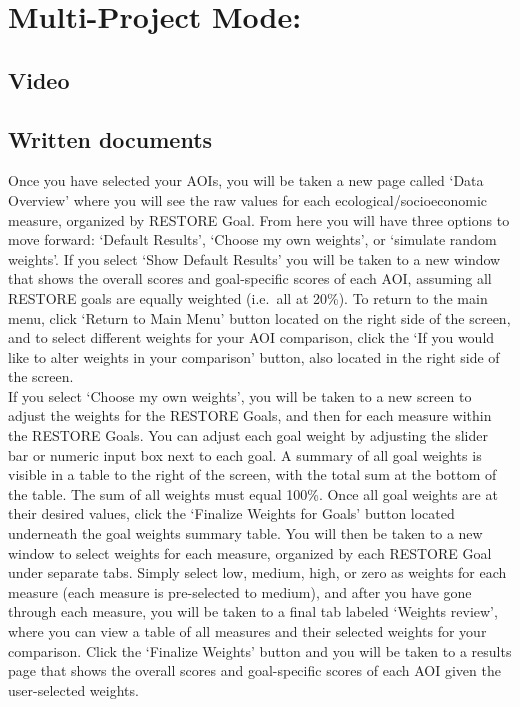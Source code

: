 \documentclass[
]{book}
\begin{document}
\hypertarget{multi-project-mode}{%
\chapter{Multi-Project Mode:}\label{multi-project-mode}}

\hypertarget{video-3}{%
\section{Video}\label{video-3}}

\hypertarget{written-documents-3}{%
\section{Written documents}\label{written-documents-3}}

Once you have selected your AOIs, you will be taken a new page called `Data Overview' where you will see the raw values for each ecological/socioeconomic measure, organized by RESTORE Goal. From here you will have three options to move forward: `Default Results', `Choose my own weights', or `simulate random weights'.
If you select `Show Default Results' you will be taken to a new window that shows the overall scores and goal-specific scores of each AOI, assuming all RESTORE goals are equally weighted (i.e.~all at 20\%). To return to the main menu, click `Return to Main Menu' button located on the right side of the screen, and to select different weights for your AOI comparison, click the `If you would like to alter weights in your comparison' button, also located in the right side of the screen.\\
If you select `Choose my own weights', you will be taken to a new screen to adjust the weights for the RESTORE Goals, and then for each measure within the RESTORE Goals. You can adjust each goal weight by adjusting the slider bar or numeric input box next to each goal. A summary of all goal weights is visible in a table to the right of the screen, with the total sum at the bottom of the table. The sum of all weights must equal 100\%. Once all goal weights are at their desired values, click the `Finalize Weights for Goals' button located underneath the goal weights summary table. You will then be taken to a new window to select weights for each measure, organized by each RESTORE Goal under separate tabs. Simply select low, medium, high, or zero as weights for each measure (each measure is pre-selected to medium), and after you have gone through each measure, you will be taken to a final tab labeled `Weights review', where you can view a table of all measures and their selected weights for your comparison. Click the `Finalize Weights' button and you will be taken to a results page that shows the overall scores and goal-specific scores of each AOI given the user-selected weights.\\
\end{document}
